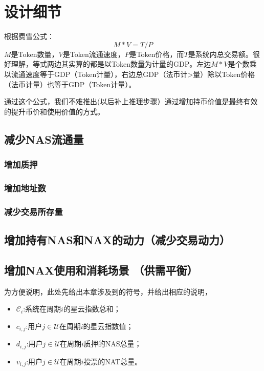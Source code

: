 \section{设计细节}


根据费雪公式：
\begin{equation}
    M * V = T / P
\end{equation}
\(M\)是Token数量，\(V\)是Token流通速度，\(P\)是Token价格，而\(T\)是系统内总交易额。很好理解，等式两边其实算的都是以Token数量为计量的GDP。左边\(M * V\)是个数乘以流通速度等于GDP（Token计量），右边总GDP（法币计>量）除以Token价格（法币计量）也等于GDP（Token计量）。

通过这个公式，我们不难推出(以后补上推理步骤）通过增加持币价值是最终有效的提升币价和使用价值的方式。

\subsection{减少NAS流通量} 
\subsubsection{增加质押} 
\subsubsection{增加地址数} 
\subsubsection{减少交易所存量} 
\subsection{增加持有NAS和NAX的动力（减少交易动力）} 
\subsection{增加NAX使用和消耗场景 （供需平衡）} 


为方便说明，此处先给出本章涉及到的符号，并给出相应的说明，
\begin{itemize}
\item $\mathcal{C}_i$:系统在周期$i$的星云指数总和；
\item $c_{i,j}$:用户$j \in \mathcal{U}$在周期$i$的星云指数值；
\item $d_{i,j}$:用户$j \in \mathcal{U}$在周期$i$质押的NAS总量；
\item $v_{i,j}$:用户$j \in \mathcal{U}$在周期$i$投票的NAT总量。
\end{itemize}

